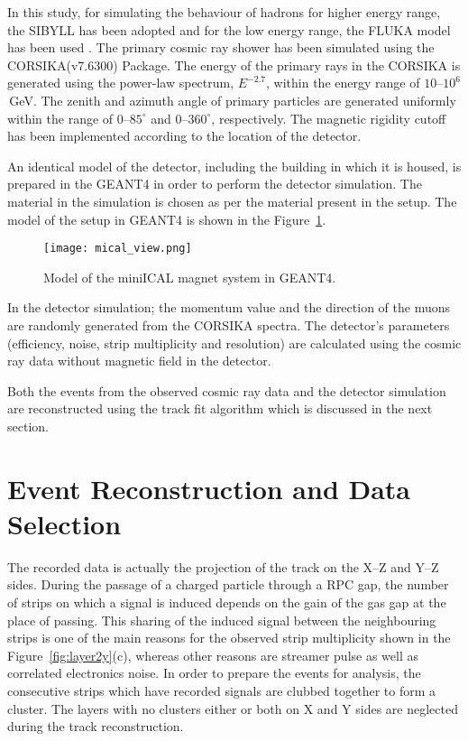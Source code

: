 In this study, for simulating the behaviour of hadrons for higher
energy range, the SIBYLL has been adopted and
for the low energy range, the FLUKA model has been used
\cite{corsika763}. The primary cosmic ray shower has been simulated
using the CORSIKA(v7.6300) Package. The energy of the primary rays in
the CORSIKA is generated using the power-law spectrum, $E^{-2.7}$,
within the energy range of \mbox{$10$--$10^{6}$\,GeV}. The zenith and
azimuth angle of primary particles are generated uniformly within the
range of \mbox{$0$--$85^\circ$} and \mbox{$0$--$360^\circ$},
respectively. The magnetic rigidity cutoff has been implemented
according to the location of the detector.

An identical model of the detector, including the building in which it
is housed, is prepared in the GEANT4 in order to perform the detector
simulation. The material in the simulation is chosen as per the
material present in the setup. The model of the setup in GEANT4 is
shown in the Figure~\ref{fig:miniICAL_view}.
\begin{figure}[h]
  \centering
  \texttt{[image: mical\_view.png]}
  \caption{Model of the miniICAL magnet system in GEANT4.}
  \label{fig:miniICAL_view}
\end{figure}
In the detector simulation; the momentum value and the direction
of the muons are randomly generated from the CORSIKA spectra.
The detector's parameters (efficiency, noise, strip multiplicity and
resolution) are calculated using the cosmic ray data without magnetic
field in the detector.

Both the events from the observed cosmic ray data and the detector
simulation are reconstructed using the track fit algorithm which is
discussed in the next section.

\section{Event Reconstruction and Data Selection} \label{sec:momreco}
The recorded data is actually the projection of the track on the
\mbox{X--Z} and \mbox{Y--Z} sides. During the passage of a charged
particle through a RPC gap, the number of strips on which a signal is
induced depends on the gain of the gas gap at the place of passing.
This sharing of the induced signal between the neighbouring strips is
one of the main reasons for the observed strip multiplicity shown in the
Figure~\ref{fig:layer2y}(c), whereas other reasons are streamer pulse
as well as correlated electronics noise.
In order to prepare the events for analysis, the consecutive strips
which have recorded signals are clubbed together to form a cluster.
The layers with no clusters either or both on X and Y sides are
neglected during the track reconstruction.

